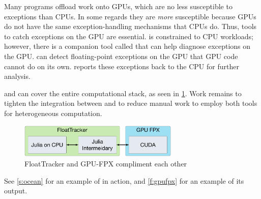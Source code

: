\documentclass{juliacon}
\begin{document}

Many programs offload work onto GPUs, which are no less susceptible to \fp{} exceptions than CPUs.
In some regards they are \emph{more} susceptible because GPUs do not have the same exception-handling mechanisms that CPUs do.
Thus, tools to catch \fp{} exceptions on the GPU are essential.
\FT{} is constrained to CPU workloads; however, there is a companion tool called \GPUFPX{}\cite{llsflg-hpdc-2023} that can help diagnose \fp{} exceptions on the GPU.
\GPUFPX{} can detect floating-point exceptions on the GPU that GPU code cannot do on its own.
\GPUFPX{} reports these exceptions back to the CPU for further analysis.

\FT{} and \GPUFPX{} can cover the entire computational stack, as seen in \cref{fig:ft_and_gpu_fpx}.
Work remains to tighten the integration between \FT{} and \GPUFPX{} to reduce manual work to employ both tools for heterogeneous computation.

\begin{figure}
  \centering
  \includegraphics[width=3in]{./fig/float_tracker_context_boxes.png}
  \caption{FloatTracker and GPU-FPX compliment each other}
  \label{fig:ft_and_gpu_fpx}
\end{figure}

See \cref{s:ocean} for an example of \GPUFPX{} in action, and \ref{f:gpufpx} for an example of its output.


\end{document}

